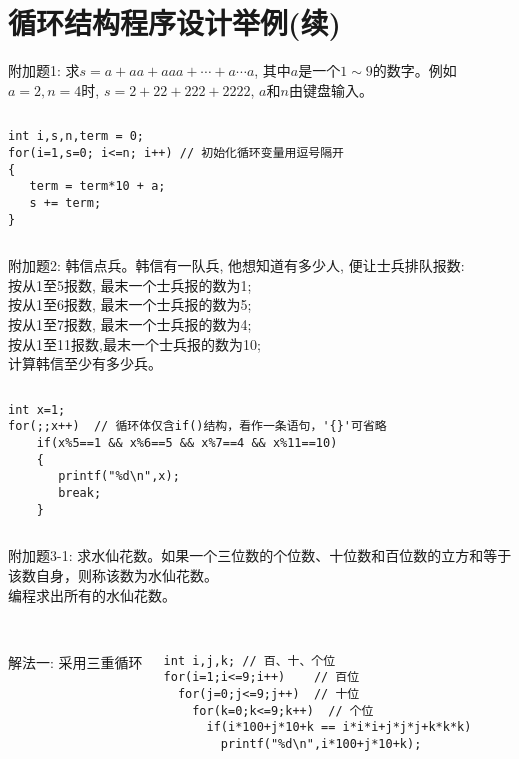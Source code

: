 
\section{循环结构程序设计举例(续)}

\begin{frame}[fragile]
附加题1: 求$s=a+aa+aaa+\cdots+a\cdots a$, 其中$a$是一个$1\sim 9$的数字。例如$a=2, n=4$时, $s=2+22+222+2222$, $a$和$n$由键盘输入。
\pause
\begin{columns}
\begin{lstlisting}
int i,s,n,term = 0;
for(i=1,s=0; i<=n; i++) // 初始化循环变量用逗号隔开
{
   term = term*10 + a;
   s += term; 
}
\end{lstlisting}
\end{columns}
\end{frame}

\begin{frame}[fragile]
\small
附加题2: 韩信点兵。韩信有一队兵, 他想知道有多少人, 便让士兵排队报数:\\
按从1至5报数, 最末一个士兵报的数为1;\\
按从1至6报数, 最末一个士兵报的数为5;\\
按从1至7报数, 最末一个士兵报的数为4;\\
按从1至11报数,最末一个士兵报的数为10;\\ 
计算韩信至少有多少兵。 
\pause
\begin{columns}
\begin{lstlisting}
int x=1;
for(;;x++)  // 循环体仅含if()结构，看作一条语句，'{}'可省略
    if(x%5==1 && x%6==5 && x%7==4 && x%11==10)
    { 
       printf("%d\n",x);  
       break;
    }
\end{lstlisting}
\end{columns}
\end{frame}

\begin{frame}[fragile]
附加题3-1: 求水仙花数。如果一个三位数的个位数、十位数和百位数的立方和等于该数自身，则称该数为水仙花数。 \\
编程求出所有的水仙花数。\\
~\\  
\pause
\begin{columns}
解法一: 采用三重循环
\begin{lstlisting}
int i,j,k; // 百、十、个位
for(i=1;i<=9;i++)    // 百位
  for(j=0;j<=9;j++)  // 十位
    for(k=0;k<=9;k++)  // 个位
      if(i*100+j*10+k == i*i*i+j*j*j+k*k*k)  
        printf("%d\n",i*100+j*10+k);
\end{lstlisting}
\end{columns}
\end{frame}

